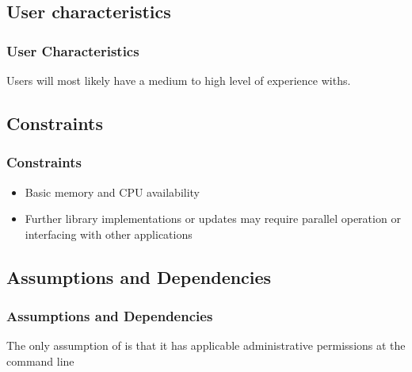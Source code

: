 \subsection{User characteristics}
\begin{frame}
\frametitle{User Characteristics}
Users will most likely have a medium  to high level of
experience with\cs s.
\end{frame}


\subsection{Constraints}

\begin{frame}
\frametitle{Constraints}
\begin{itemize}
\item Basic memory and CPU availability
\item Further library implementations or updates may require parallel operation or interfacing with other applications
\end{itemize}
\end{frame}


\subsection{Assumptions and Dependencies}

\begin{frame}
\frametitle{Assumptions and Dependencies}
The only assumption of \cry{} is that it has applicable
administrative permissions at the command line
\end{frame}

